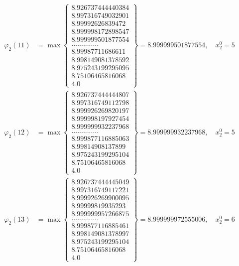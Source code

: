 \documentclass{article}
\begin{document}
\begin{align*}
  
  
  
\varphi_{2}(11) &= \max \left\{ \begin{array}{c}
8.926737444440384 \\
 8.997316749032901 \\
 8.99992626839472 \\
 8.999998172898547 \\
 8.999999501877554 \\
 .............. \\
 8.99987711686611 \\
 8.998149081378592 \\
 8.975243199295095 \\
 8.75106465816068 \\
 4.0
\end{array} \right\} = 8.999999501877554, \quad x_{2}^0 = 5\\
  
  
  
  
\varphi_{2}(12) &= \max \left\{ \begin{array}{c}
8.926737444444807 \\
 8.997316749112798 \\
 8.999926269820197 \\
 8.999998197927454 \\
 8.999999932237968 \\
 .............. \\
 8.999877116885063 \\
 8.99814908137899 \\
 8.975243199295104 \\
 8.75106465816068 \\
 4.0
\end{array} \right\} = 8.999999932237968, \quad x_{2}^0 = 5\\
  
  
  
  
\varphi_{2}(13) &= \max \left\{ \begin{array}{c}
8.926737444445049 \\
 8.997316749117221 \\
 8.999926269900095 \\
 8.99999819935293 \\
 8.999999957266875 \\
 .............. \\
 8.999877116885461 \\
 8.998149081378997 \\
 8.975243199295104 \\
 8.75106465816068 \\
 4.0
\end{array} \right\} = 8.999999972555006, \quad x_{2}^0 = 6\\
  

\end{align*}
\end{document}
